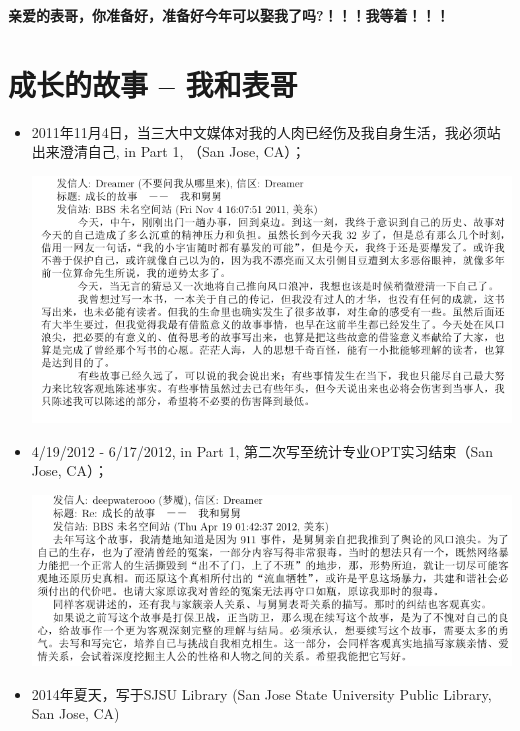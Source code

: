 \documentclass[9pt, b5paper]{article}
\begin{document}
\textbf{亲爱的表哥，你准备好，准备好今年可以娶我了吗?！！！我等着！！！}

\section{成长的故事 -- 我和表哥}
\label{sec:orgc9ce42f}
\begin{itemize}
\item 2011年11月4日，当三大中文媒体对我的人肉已经伤及我自身生活，我必须站出来澄清自己, in Part 1, （San Jose, CA）；

\begin{center}
\includegraphics[width=.9\linewidth]{./pic/dreamer1.png}
\end{center}
\item 4/19/2012 - 6/17/2012, in Part 1, 第二次写至统计专业OPT实习结束（San Jose, CA）；

\begin{center}
\includegraphics[width=.9\linewidth]{./pic/dreamer2.png}
\end{center}
\item 2014年夏天，写于SJSU Library (San Jose State University Public Library, San Jose, CA)


\end{itemize}
\end{document}
